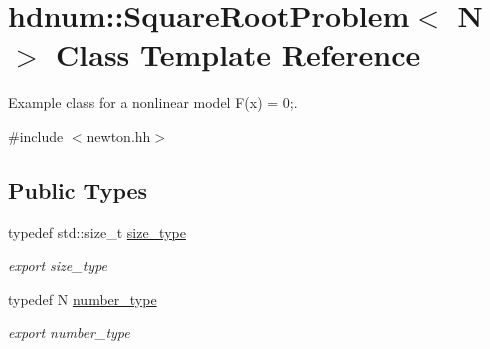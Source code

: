 \hypertarget{classhdnum_1_1SquareRootProblem}{
\section{hdnum::SquareRootProblem$<$ N $>$ Class Template Reference}
\label{classhdnum_1_1SquareRootProblem}
}


Example class for a nonlinear model F(x) = 0;.  




{\ttfamily \#include $<$newton.hh$>$}

\subsection*{Public Types}
\begin{DoxyCompactItemize}
\item 
\hypertarget{classhdnum_1_1SquareRootProblem_a9c7024d33b3c33be60fd50cf8a95ec12}{
typedef std::size\_\-t \hyperlink{classhdnum_1_1SquareRootProblem_a9c7024d33b3c33be60fd50cf8a95ec12}{size\_\-type}}
\label{classhdnum_1_1SquareRootProblem_a9c7024d33b3c33be60fd50cf8a95ec12}

\begin{DoxyCompactList}\small\item\em export size\_\-type \item\end{DoxyCompactList}\item 
\hypertarget{classhdnum_1_1SquareRootProblem_a2aada07411c6a24edd9183c73b79f042}{
typedef N \hyperlink{classhdnum_1_1SquareRootProblem_a2aada07411c6a24edd9183c73b79f042}{number\_\-type}}
\label{classhdnum_1_1SquareRootProblem_a2aada07411c6a24edd9183c73b79f042}

\begin{DoxyCompactList}\small\item\em export number\_\-type \item\end{DoxyCompactList}\end{DoxyCompactItemize}
